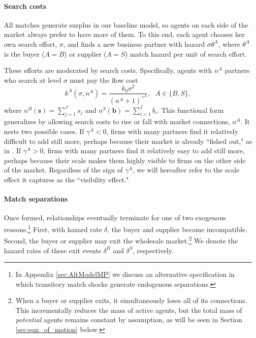 \documentclass[12pt]{article} \usepackage{amsmath,amssymb,amsthm,geometry,graphicx,setspace,algorithm,algpseudocode,float}
\begin{document}
\paragraph{Search costs}
 All matches generate surplus in our baseline model, so agents on each side of the market always prefer to have more of them. To this end, each agent chooses her own search effort, $\sigma$, and finds a new business partner with hazard $\sigma \theta^A$, where $\theta^A$ is the buyer ($A=B$) or supplier ($A=S$) match hazard per unit of search effort.
 \par
These efforts are moderated by search costs. Specifically, agents with $n^A$ partners who search at level $\sigma$ must pay the flow cost 
\begin{equation}
\label{eqn: cost_fn}
k^A \left( \sigma, n^A \right) =\frac{k_0\sigma^2}{\left(
n^{A}+1\right) ^{\gamma^{A}}},\text{ \ \ }A\in \{B,S\},  
\end{equation}
where $n^{B}(\mathbf{s}) =\sum_{j=1}^{J}s_{j}$ and $n^{S}(\mathbf{b}) =\sum_{i=1}^{I}b_{i}.$ This functional form generalizes \citet{arkolakis2010market} by allowing search costs to rise or fall with market connections, $n^A$. It nests two possible cases. If $\gamma ^{A}<0$, firms with many partners find it relatively difficult to add still more, perhaps because their market is already ``fished out," as in \citet{arkolakis2010market}. If $\gamma ^{A}>0$, firms with many partners find it relatively easy to add still more, perhaps because their scale makes them highly visible to firms on the other side of the market. Regardless of the sign of $\gamma ^{A}$, we will hereafter refer to the scale effect it captures as the ``visibility effect." 

\paragraph{Match separations}
 Once formed, relationships eventually terminate for one of two exogenous reasons.\footnote{In Appendix \ref{sec:AltModelMP} we discuss an alternative specification in which transitory match shocks generate endogenous separations.\medskip} First, with hazard rate $\delta$, the buyer and supplier become incompatible. Second, the buyer or supplier may exit the wholesale market.\footnote{When a buyer or supplier exits, it simultaneously loses all of its connections. This incrementally reduces the mass of active agents, but the total mass of \textit{potential} agents remains constant by assumption, as will be seen in Section \ref{sec:eqn_of_motion} below.\medskip} We denote the hazard rates of these exit events $\delta^B$ and $\delta^S$, respectively.
\end{document}
